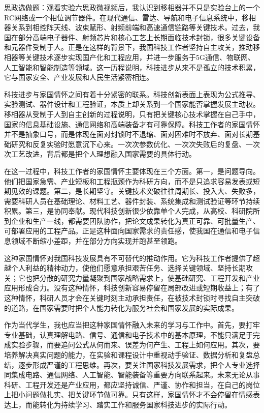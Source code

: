\documentclass{eleclab-report}
\newcommand{\AnalysisParagraph}[1]{\par\hspace*{2em}#1\par}
\begin{document}
\AnalysisParagraph{思政选做题：观看实验六思政微视频后，我认识到移相器并不只是实验台上的一个RC网络或一个相位调节器件。在现代通信、雷达、导航和电子信息系统中，移相器关系到相控阵天线、波束赋形、射频前端和高速通信链路等关键技术。过去，我国在部分高端电子器件、射频芯片和核心工艺上长期面临技术封锁，很多关键设备和元器件受制于人。正是在这样的背景下，我国科技工作者坚持自主攻关，推动移相器等关键技术逐步实现国产化和工程应用，并进一步服务于5G通信、物联网、人工智能和智能制造等领域。这一历程说明，科技进步从来不是孤立的技术积累，它与国家安全、产业发展和人民生活紧密相连。}
\AnalysisParagraph{科技进步与家国情怀之间有着十分紧密的联系。科技创新表面上表现为公式推导、实验测试、器件设计和工程验证，本质上却关系到一个国家能否掌握发展主动权。移相器从受制于人到自主创新的过程说明，只有把关键核心技术掌握在自己手中，国家的信息基础设施、通信网络和高端装备才有可靠保障。科技工作者的家国情怀并不是抽象口号，而是体现在面对封锁时不退缩、面对困难时不放弃、面对长期基础研究和反复实验时愿意沉下心来。一次次参数优化、一次次失败后的复盘、一次次工艺改进，背后都是把个人理想融入国家需要的具体行动。}
\AnalysisParagraph{在这一过程中，科技工作者的家国情怀主要体现在三个方面。第一，是问题导向。他们把国家急需、产业短板和工程瓶颈作为科研方向，而不是只追求容易发表或短期见效的课题。第二，是长期坚守。关键技术突破往往周期长、投入大、失败多，需要科研人员在基础理论、材料工艺、器件封装、系统集成和测试验证等环节持续积累。第三，是协同奉献。现代科技创新很少依靠单个人完成，从高校、科研院所到企业和生产一线，都需要团队协作，把论文成果转化为真正可靠、可批量生产、可部署应用的工程产品。正是这种面向国家需求的责任感，使我国在通信和电子信息领域不断缩小差距，并在部分方向实现并跑甚至领跑。}
\AnalysisParagraph{这种家国情怀对我国科技发展具有不可替代的推动作用。它为科技工作者提供了超越个人利益的精神动力，使他们愿意承担艰苦任务、选择关键领域、坚持长期攻关；它也把分散的研究力量凝聚到国家战略需求上，使基础研究、工程开发和产业应用形成合力。没有这种情怀，科技创新容易停留在局部改进或短期收益上；有了这种情怀，科研人员才会在关键时刻主动承担责任，在被技术封锁时寻找自主突破的道路，在国家需要时把个人能力转化为服务社会和国家发展的实际成果。}
\AnalysisParagraph{作为当代学生，我也应当把这种家国情怀融入未来的学习与工作中。首先，要打牢专业基础，认真理解电路、信号、通信和电子技术中的基本原理，不能只满足于完成实验步骤，而要追问公式从何而来、误差为何产生、工程上如何应用。其次，要培养解决真实问题的能力，在实验和课程设计中重视动手验证、数据分析和复盘总结，逐步形成严谨的工程思维。再次，要关注国家科技发展需求，把个人专业选择同集成电路、通信网络、人工智能、智能装备等重要方向联系起来。未来无论从事科研、工程开发还是产业应用，都应坚持诚信、严谨、协作和担当，在自己的岗位上把小问题做扎实、把关键环节做可靠。只有这样，家国情怀才不会停留在情感表达上，而能转化为持续学习、踏实工作和服务国家科技进步的实际行动。}
\end{document}
